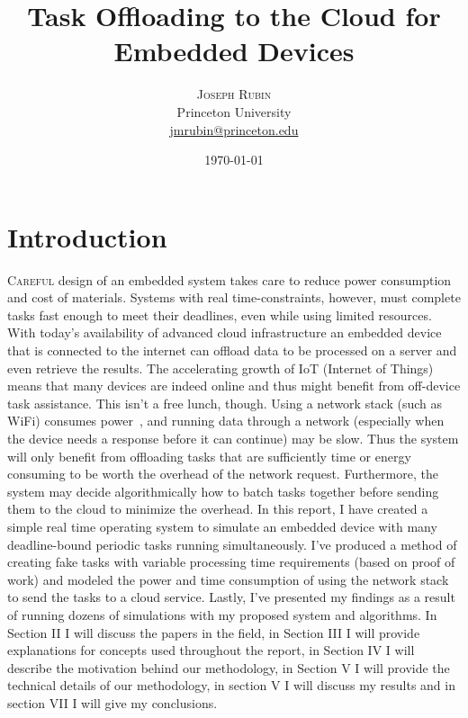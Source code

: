 \documentclass[twoside,twocolumn]{article}
\title{Task Offloading to the Cloud for Embedded Devices} %
\author{%
\textsc{Joseph Rubin} \\[1ex] %
\normalsize Princeton University \\ %
\normalsize \href{mailto:jmrubin@princeton.edu}{jmrubin@princeton.edu} %
}
\date{\today} %
\newcommand{\newp}{\newline\indent}
\begin{document}
\maketitle


\section{Introduction}

\lettrine[nindent=0em,lines=3]{C}{areful} design of an embedded system takes care to reduce power consumption and cost of materials.
Systems with real time-constraints, however, must complete tasks fast enough to meet their deadlines, even while using limited resources.
With today's availability of advanced cloud infrastructure an embedded device that is connected to the internet can offload data to be processed on a server and even retrieve the results.
The accelerating growth of IoT (Internet of Things)~\cite{7750968} means that many devices are indeed online and thus might benefit from off-device task assistance.
\newp This isn't a free lunch, though.
Using a network stack (such as WiFi) consumes power~\cite{7545919}, and running data through a network (especially when the device needs a response before it can continue) may be slow.
Thus the system will only benefit from offloading tasks that are sufficiently time or energy consuming to be worth the overhead of the network request.
Furthermore, the system may decide algorithmically how to batch tasks together before sending them to the cloud to minimize the overhead.
\newp In this report, I have created a simple real time operating system to simulate an embedded device with many deadline-bound periodic tasks running simultaneously.
I've produced a method of creating fake tasks with variable processing time requirements (based on proof of work) and modeled the power and time consumption of using the network stack to send the tasks to a cloud service.
Lastly, I've presented my findings as a result of running dozens of simulations with my proposed system and algorithms.
\newp In Section II I will discuss the papers in the field, in Section III I will provide explanations for concepts used throughout the report, in Section IV I will describe the motivation behind our methodology, in Section V I will provide the technical details of our methodology, in section V I will discuss my results and in section VII I will give my conclusions.
\end{document}
